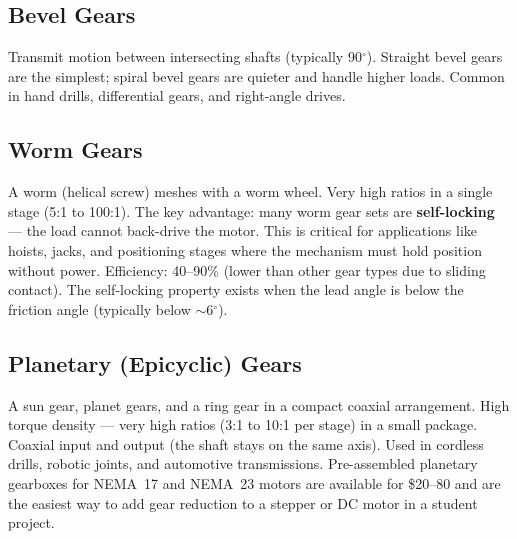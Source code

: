 \documentclass[11pt,letterpaper,twoside,openany]{book}
\begin{document}
\subsection{Bevel Gears}
Transmit motion between intersecting shafts (typically 90\ensuremath{{}^{\circ}}). Straight bevel gears are the simplest; spiral bevel gears are quieter and handle higher loads. Common in hand drills, differential gears, and right-angle drives.

\subsection{Worm Gears}
A worm (helical screw) meshes with a worm wheel. Very high ratios in a single stage (5:1 to 100:1). The key advantage: many worm gear sets are \textbf{self-locking} --- the load cannot back-drive the motor. This is critical for applications like hoists, jacks, and positioning stages where the mechanism must hold position without power. Efficiency: 40--90\% (lower than other gear types due to sliding contact). The self-locking property exists when the lead angle is below the friction angle (typically below $\sim$6\ensuremath{{}^{\circ}}).

\subsection{Planetary (Epicyclic) Gears}
A sun gear, planet gears, and a ring gear in a compact coaxial arrangement. High torque density --- very high ratios (3:1 to 10:1 per stage) in a small package. Coaxial input and output (the shaft stays on the same axis). Used in cordless drills, robotic joints, and automotive transmissions. Pre-assembled planetary gearboxes for NEMA~17 and NEMA~23 motors are available for \$20--80 and are the easiest way to add gear reduction to a stepper or DC motor in a student project.
\end{document}
